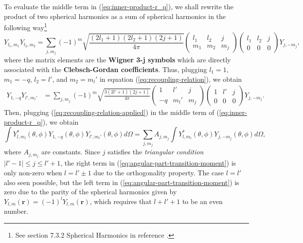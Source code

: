 {To evaluate the middle term in (\ref{eq:inner-product-r_q}), we shall rewrite the product of two spherical harmonics as a sum of spherical harmonics in the following way\footnote{See section 7.3.2 Spherical Harmonics in reference \cite{steck2007quantum}.}
\begin{equation}
	Y_{l_1,m_1} Y_{l_2,m_2} = \sum_{j,m_j} (-1)^m \sqrt{\frac{(2l_1 + 1)(2l_2 + 1)(2j + 1)}{4\pi}} \left(\begin{matrix} l_1 & l_2 & j \\ m_1 & m_2 & m_j \end{matrix}\right) \left(\begin{matrix} l_1 & l_2 & j \\ 0 & 0 & 0 \end{matrix}\right)Y_{j,-m_j},
	\label{eq:recoupling-relation}
\end{equation}
where the matrix elements are the \textbf{Wigner 3-j symbols} which are directly associated with the \textbf{Clebsch-Gordan coefficients}. Thus, plugging $ l_1 = 1 $, $ m_1 = -q $, $ l_2 = l' $, and $ m_2 = m_l' $ in equation (\ref{eq:recoupling-relation}), we obtain
\begin{align}
	Y_{1,-q} Y_{l',m_l'} &= \sum_{j,m_j} (-1)^m \sqrt{\frac{3(2l' + 1)(2j + 1)}{4\pi}} \left(\begin{matrix} 1 & l' & j \\ -q & m_l' & m_j \end{matrix}\right) \left(\begin{matrix} 1 & l' & j \\ 0 & 0 & 0 \end{matrix}\right)Y_{j,-m_j}.
	\label{eq:recoupling-relation-applied}
\end{align}
Then, plugging (\ref{eq:recoupling-relation-applied}) in the middle term of (\ref{eq:inner-product-r_q}), we obtain
\begin{equation}
	\int Y_{l,m_l}^*(\theta, \phi) Y_{1, -q}(\theta, \phi) Y_{l', m_l'}(\theta, \phi)d\Omega =  \sum_{j,m_j} A_{j,m_j} \int Y^*_{l,m_l}(\theta, \phi) Y_{j,-m_j}(\theta, \phi) d\Omega,
	\label{eq:angular-part-transition-moment}
\end{equation}
where $ A_{j,m_j} $ are constants. Since $ j $ satisfies the \textit{triangular condition} $ |l' - 1| \leq j \leq l' + 1 $, the right term in (\ref{eq:angular-part-transition-moment}) is only non-zero when $ l = l' \pm 1 $ due to the orthogonality property. The case $ l = l' $ also seen possible, but the left term in (\ref{eq:angular-part-transition-moment}) is zero due to the parity of the spherical harmonics given by $ Y_{l,m}(\mathbf{r}) = (-1)^l Y_{l,m}(\mathbf{r}) $, which requires that $ l + l' + 1 $ to be an even number. 

}
